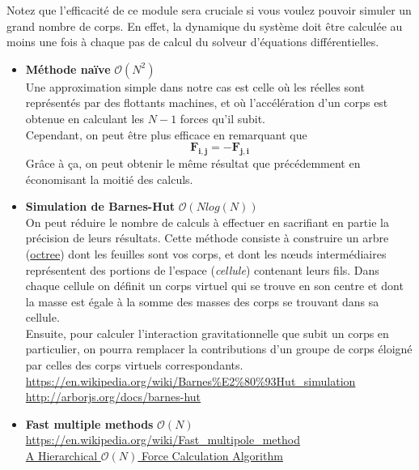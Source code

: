 \documentclass{article}
\newcommand{\myvec}[1]{\ensuremath{\mathbf{#1}}}
\begin{document}
Notez que l'efficacité de ce module sera cruciale si vous voulez pouvoir simuler un grand nombre de corps. En effet, la dynamique du système doit être calculée au moins une fois à chaque pas de calcul du solveur d'équations différentielles.

\begin{itemize}
    \item \textbf{Méthode naïve} $\mathcal{O}(N^2)$ \\
    Une approximation simple dans notre cas est celle où les réelles sont représentés par des flottants machines, et où l'accélération d'un corps est obtenue en calculant les $N-1$ forces qu'il subit.\\
    Cependant, on peut être plus efficace en remarquant que
    \begin{equation*}
    \myvec{F_{i,j}} = - \myvec{F_{j,i}}
    \end{equation*}
    Grâce à ça, on peut obtenir le même résultat que précédemment en économisant la moitié des calculs.
    \item \textbf{Simulation de Barnes-Hut} $\mathcal{O}(N log(N))$ \\
    On peut réduire le nombre de calculs à effectuer en sacrifiant en partie la précision de leurs résultats. Cette méthode consiste à construire un arbre (\href{https://en.wikipedia.org/wiki/Octree}{octree}) dont les feuilles sont vos corps, et dont les nœuds intermédiaires représentent des portions de l'espace (\emph{cellule}) contenant leurs fils. Dans chaque cellule on définit un corps virtuel qui se trouve en son centre et dont la masse est égale à la somme des masses des corps se trouvant dans sa cellule. \\
    Ensuite, pour calculer l'interaction gravitationnelle que subit un corps en particulier, on pourra remplacer la contributions d'un groupe de corps éloigné par celles des corps virtuels correspondants. \\
    \url{https://en.wikipedia.org/wiki/Barnes\%E2\%80\%93Hut_simulation}\\
    \url{http://arborjs.org/docs/barnes-hut}
    \item \textbf{Fast multiple methods} $\mathcal{O}(N)$ \\
    \url{https://en.wikipedia.org/wiki/Fast_multipole_method}\\
    \href{https://arxiv.org/pdf/astro-ph/0202512.pdf}{A Hierarchical $\mathcal{O}(N)$ Force Calculation Algorithm}
\end{itemize}
\end{document}
